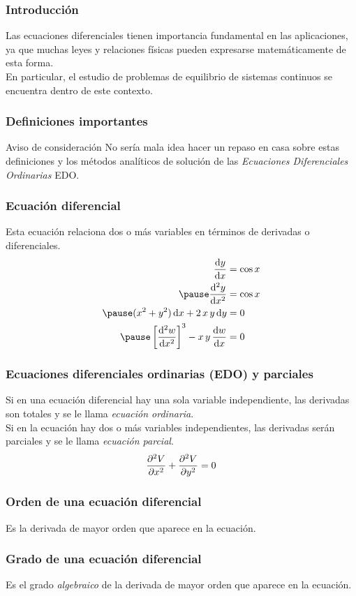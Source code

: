 \documentclass[12pt]{beamer}
\begin{document}
\begin{frame}
\frametitle{Introducción}
Las ecuaciones diferenciales tienen importancia fundamental en las aplicaciones, ya que muchas leyes y relaciones físicas pueden expresarse matemáticamente de esta forma.
\\
\medskip
\pause
En particular, el estudio de problemas de equilibrio de sistemas continuos se encuentra dentro de este contexto.
\end{frame}
\begin{frame}
\frametitle{Definiciones importantes}
\begin{block}{Aviso de consideración}
No sería mala idea hacer un repaso en casa sobre estas definiciones y los métodos analíticos de solución de las	\textit{Ecuaciones Diferenciales Ordinarias} EDO.
\end{block}
\end{frame}
\begin{frame}
\frametitle{Ecuación diferencial}
Esta ecuación relaciona dos o más variables en términos de derivadas o diferenciales.
\pause
\begin{eqnarray*}
\begin{aligned}
\dv{y}{x} &= \cos x \\ \pause
\dv[2]{y}{x} &= \cos x \\ \pause
( x^{2} + y^{2} ) \dd{x} + 2 \, x \, y \dd{y} &= 0 \\ \pause
\left[ \dv[2]{w}{x} \right]^{3} - x \, y \, \dv{w}{x} &= 0 
\end{aligned}
\end{eqnarray*}
\end{frame}
\begin{frame}
\frametitle{Ecuaciones diferenciales ordinarias (EDO) y parciales}
Si en una ecuación diferencial hay una sola variable independiente, las derivadas son totales y se le llama \textit{ecuación ordinaria}.
\\
\medskip
\pause
Si en la ecuación hay dos o más variables independientes, las derivadas serán parciales y se le llama \textit{ecuación parcial}.
\begin{align*}
\pdv[2]{V}{x} + \pdv[2]{V}{y} = 0
\end{align*}
\end{frame}
\begin{frame}
\frametitle{Orden de una ecuación diferencial}
Es la derivada de mayor orden que aparece en la ecuación.
\end{frame}
\begin{frame}
\frametitle{Grado de una ecuación diferencial}
Es el grado \textit{algebraico} de la derivada de mayor orden que aparece en la ecuación.
\end{frame}
\end{document}
